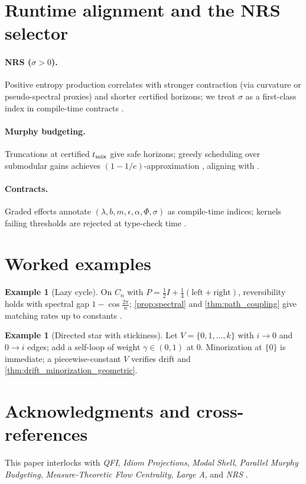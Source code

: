 \documentclass[11pt]{article}
\theoremstyle{plain}
\theoremstyle{definition}
\newtheorem{example}[theorem]{Example}
\theoremstyle{remark}
\newcommand{\1}{\mathds{1}}
\newcommand{\EP}{\sigma}
\begin{document}
\section{Runtime alignment and the NRS selector}
\paragraph{NRS (\texorpdfstring{$\EP>0$}{EP>0}).} Positive entropy production correlates with stronger contraction (via curvature or pseudo-spectral proxies) and shorter certified horizons; we treat $\EP$ as a first-class index in compile-time contracts \cite{NRSinPrep2025}.

\paragraph{Murphy budgeting.} Truncations at certified $t_{\rm mix}$ give safe horizons; greedy scheduling over submodular gains achieves $(1-1/e)$-approximation \cite[Ch.~6]{LevinPeresWilmer2009}, aligning with \cite{MurphyBudget2025}.

\paragraph{Contracts.} Graded effects annotate $(\lambda,b,m,\epsilon,\alpha,\Phi,\EP)$ as compile-time indices; kernels failing thresholds are rejected at type-check time \cite{GradedEffects2025}.

\section{Worked examples}
\begin{example}[Lazy cycle]
On $C_n$ with $P=\tfrac12 I+\tfrac14(\text{left}+\text{right})$, reversibility holds with spectral gap $1-\cos\!\tfrac{2\pi}{n}$; \cref{prop:spectral} and \cref{thm:path_coupling} give matching rates up to constants \cite{LevinPeresWilmer2009,BubleyDyer1997}.
\end{example}

\begin{example}[Directed star with stickiness]
Let $V=\{0,1,\ldots,k\}$ with $i\to 0$ and $0\to i$ edges; add a self-loop of weight $\gamma\in(0,1)$ at $0$. Minorization at $\{0\}$ is immediate; a piecewise-constant $V$ verifies drift and \cref{thm:drift_minorization_geometric}.
\end{example}

\section*{Acknowledgments and cross-references}
This paper interlocks with \emph{QFI}, \emph{Idiom Projections}, \emph{Modal Shell}, \emph{Parallel Murphy Budgeting}, \emph{Measure‑Theoretic Flow Centrality}, \emph{Large A}, and \emph{NRS} \cite{QFI2025,IdiomProjections2025,ModalShell2025,MurphyBudget2025,FlowCentrality2025,GradedEffects2025,NRSinPrep2025}.

\nocite{*}
\printbibliography
\end{document}
